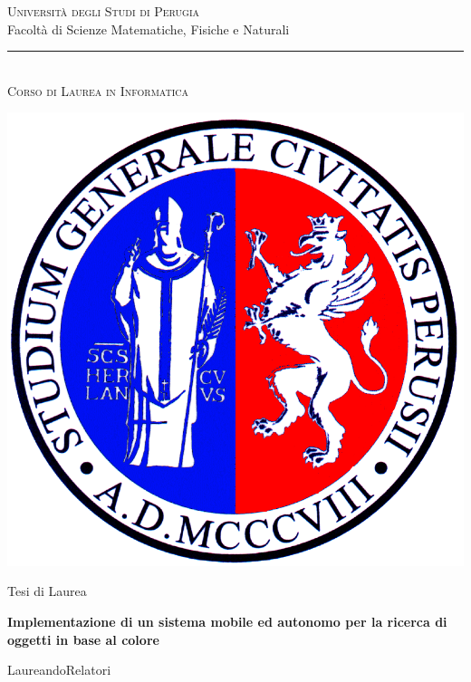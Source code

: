 \documentclass[a4paper,12pt]{report}
\title{\begin{large}\textbf{\titolotesi}\end{large}}
\author{\laureando}
\def\titolotesi{Implementazione di un sistema mobile ed autonomo per la ricerca di oggetti in base al colore} %
\begin{document}
\begin{titlepage}
\begin{center}
\textsc{\Large Universit\`a degli Studi di Perugia}\medskip\\

{\Large Facolt\`a di Scienze Matematiche, Fisiche e Naturali}\medskip\\

\rule{10mm}{0.01mm}\medskip\\

{\small \textsc{Corso di Laurea in Informatica}}\medskip\\

\vspace*{5mm}

\includegraphics[scale=0.2]{immagini/logouni.png}

\Large Tesi di Laurea \par\bigskip

{\large \bf \titolotesi \par}

\bigskip\bigskip

\end{center}\par

\hspace{0.5cm}Laureando\hspace{7.3cm}Relatori\par


\end{titlepage}
\end{document}
